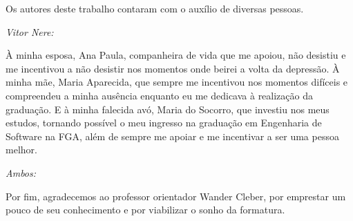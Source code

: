 \begin{agradecimentos}

Os autores deste trabalho contaram com o auxílio de diversas pessoas.

\textit{Vitor Nere:}

À minha esposa, Ana Paula, companheira de vida que me apoiou, não desistiu e me incentivou a não desistir nos momentos onde beirei a volta da depressão. À minha mãe, Maria Aparecida, que sempre me incentivou nos momentos difíceis e compreendeu a minha ausência enquanto eu me dedicava à realização da graduação. E à minha falecida avó, Maria do Socorro, que investiu nos meus estudos, tornando possível o meu ingresso na graduação em Engenharia de Software na FGA, além de sempre me apoiar e me incentivar a ser uma pessoa melhor.

\textit{Ambos:}

Por fim, agradecemos ao professor orientador Wander Cleber, por emprestar um
pouco de seu conhecimento e por viabilizar o sonho da formatura.

\end{agradecimentos}
